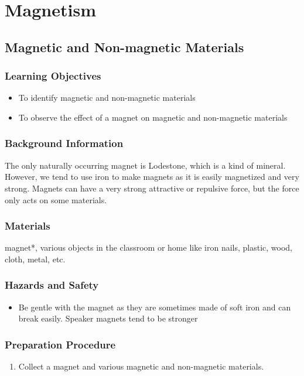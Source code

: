 \section{Magnetism}

\subsection{Magnetic and Non-magnetic Materials}

\subsubsection*{Learning Objectives}
\begin{itemize}
\item{To identify magnetic and non-magnetic materials} 
\item{To observe the effect of a magnet on magnetic and non-magnetic materials} 
\end{itemize}

\subsubsection*{Background Information}
The only naturally occurring magnet is Lodestone, which is a kind of mineral. However, we tend to use iron to make magnets as it is easily magnetized and very strong. Magnets can have a very strong attractive or repulsive force, but the force only acts on some materials.

\subsubsection*{Materials}
magnet*, various objects in the classroom or home like iron nails, plastic, wood, cloth, metal, etc.  

\subsubsection*{Hazards and Safety}
\begin{itemize}
\item{Be gentle with the magnet as they are sometimes made of soft iron and can break easily.  Speaker magnets tend to be stronger}
\end{itemize}

\subsubsection*{Preparation Procedure}
\begin{enumerate}
\item{Collect a magnet and various magnetic and non-magnetic materials.} 
\end{enumerate}

